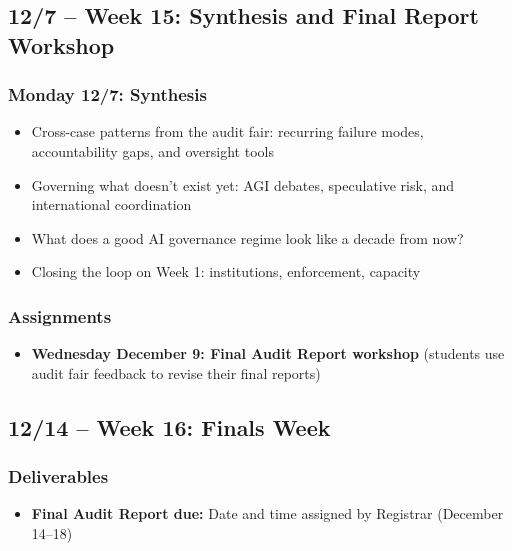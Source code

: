 \documentclass[12pt]{article}
\begin{document}
\subsection*{12/7 -- Week 15: Synthesis and Final Report Workshop}
    \subsubsection*{Monday 12/7: Synthesis}
        \begin{itemize}
            \item Cross-case patterns from the audit fair: recurring failure modes, accountability gaps, and oversight tools
            \item Governing what doesn't exist yet: AGI debates, speculative risk, and international coordination
            \item What does a good AI governance regime look like a decade from now?
            \item Closing the loop on Week 1: institutions, enforcement, capacity
        \end{itemize}
    \subsubsection*{Assignments}
        \begin{itemize}
            \item \textbf{Wednesday December 9: Final Audit Report workshop} (students use audit fair feedback to revise their final reports)
        \end{itemize}

\subsection*{12/14 -- Week 16: Finals Week}
    \subsubsection*{Deliverables}
        \begin{itemize}
            \item \textbf{Final Audit Report due:} Date and time assigned by Registrar (December 14--18)
        \end{itemize}

\bigskip
\renewcommand{\refname}{Appendix: Reading List}
\renewcommand{\bibpreamble}{%
    \noindent Full citations for the assigned readings listed in the course schedule above. All items other than the required book are provided through \emph{Canvas} and the Pollak Library at no cost. Readings marked in the schedule as updated each offering (current investigative reporting, case dossiers, and regulatory trackers) are posted to \emph{Canvas} at the start of the semester and are not listed here.\par\vspace{0.75\baselineskip}}
\end{document}
